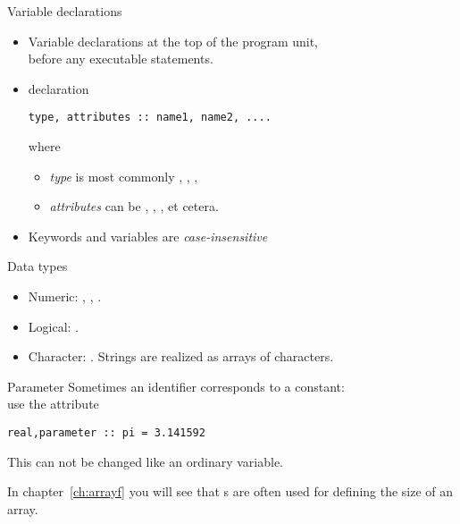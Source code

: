 \begin{slide}{Variable declarations}
  \label{sl:fvars}
  \begin{itemize}
  \item Variable declarations at the top of the program unit,\\
    before any executable statements.
  \item declaration
\begin{lstlisting}
type, attributes :: name1, name2, ....
\end{lstlisting}
where
\begin{itemize}
\item \textit{type} is most commonly ,
  , ,
\item \textit{attributes} can be ,
  , ,
   et cetera.
\end{itemize}
\item Keywords and variables are
  \emph{case-insensitive}
\end{itemize}
\end{slide}

\begin{block}{Data types}
  \label{sl:ftypes}
  \begin{itemize}
  \item Numeric: , ,
    . 
  \item Logical: .
  \item Character: . Strings are realized as
    arrays of characters.
  \end{itemize}  
\end{block}

\begin{block}{Parameter}
  \label{sl:fparameter}
  Sometimes an identifier corresponds to a constant:\\
  use the  attribute
\begin{lstlisting}
real,parameter :: pi = 3.141592    
\end{lstlisting}
  This can not be changed like an ordinary variable.
\end{block}

In chapter~\ref{ch:arrayf} you will see that
s are often used for defining the size of an
array.

